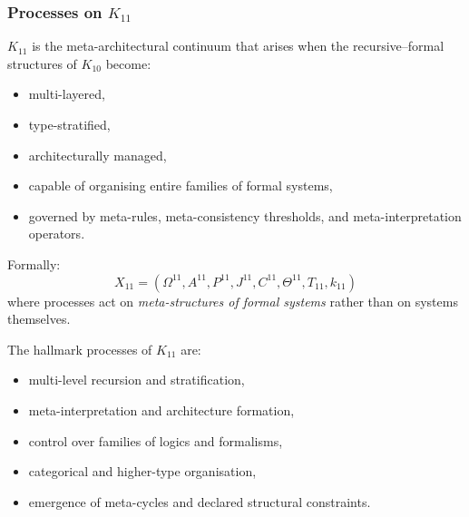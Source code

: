 

\subsubsection{Processes on $K_{11}$}
\label{sec:processes-k11}

$K_{11}$ is the meta-architectural continuum that arises when the
recursive–formal structures of $K_{10}$ become:
\begin{itemize}
    \item multi-layered,
    \item type-stratified,
    \item architecturally managed,
    \item capable of organising entire families of formal systems,
    \item governed by meta-rules, meta-consistency thresholds,
          and meta-interpretation operators.
\end{itemize}

Formally:
\[
X_{11} = (\Omega^{11}, A^{11}, P^{11}, J^{11},
          C^{11}, \Theta^{11}, T_{11}, k_{11})
\]
where processes act on \emph{meta-structures of formal systems} rather
than on systems themselves.

The hallmark processes of $K_{11}$ are:
\begin{itemize}
    \item multi-level recursion and stratification,
    \item meta-interpretation and architecture formation,
    \item control over families of logics and formalisms,
    \item categorical and higher-type organisation,
    \item emergence of meta-cycles and declared structural constraints.
\end{itemize}

